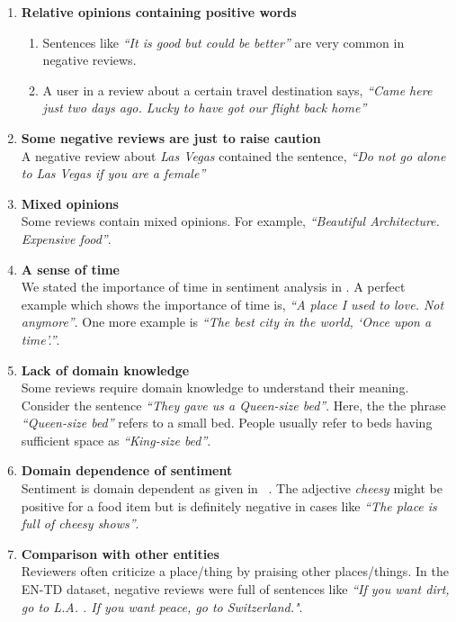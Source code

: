 \begin{enumerate}
 \item \textbf{Relative opinions containing positive words}
  \begin{enumerate}
    \item Sentences like \textit{``It is good but could be better''} are very common in negative reviews.
    \item A user in a review about a certain travel destination says, \textit{``Came here just two days ago. Lucky to have got our flight back home''}
  \end{enumerate}
 \item \textbf{Some negative reviews are just to raise caution} \\
  A negative review about \textit{Las Vegas} contained the sentence, \textit{``Do not go alone to Las Vegas if you are a female''}
 \item \textbf{Mixed opinions} \\
  Some reviews contain mixed opinions. For example, \textit{``Beautiful Architecture. Expensive food''}.
 \item \textbf{A sense of time} \\
  We stated the importance of time in sentiment analysis in . A perfect example which shows the importance of time is, \textit{``A place I used to love. Not 
  anymore''}. One more example is \textit{``The best city in the world, `Once upon a time'.''}.
 \item \textbf{Lack of domain knowledge} \\
  Some reviews require domain knowledge to understand their meaning. Consider the sentence \textit{``They gave us a Queen-size bed''}. Here, the the phrase 
  \textit{``Queen-size bed''} refers to a small bed. People usually refer to beds having sufficient space as \textit{``King-size bed''}.
 \item \textbf{Domain dependence of sentiment} \\
  Sentiment is domain dependent as given in ~\citep*{liu2010sentiment}. The adjective \textit{cheesy} might be positive for a food item but is definitely negative in cases
  like \textit{``The place is full of cheesy shows''}.  
 \item \textbf{Comparison with other entities} \\
  Reviewers often criticize a place/thing by praising other places/things. In the EN-TD dataset, negative reviews were full of sentences like \textit{``If you want dirt, go 
  to L.A. . If you want peace, go to Switzerland."}.

\end{enumerate}
